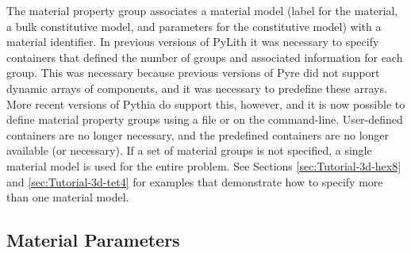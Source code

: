 The material property group associates a material model (label for the
material, a bulk constitutive model, and parameters for the
constitutive model) with a material identifier. In previous versions
of PyLith it was necessary to specify containers that defined the
number of groups and associated information for each group. This was
necessary because previous versions of Pyre did not support dynamic
arrays of components, and it was necessary to predefine these
arrays. More recent versions of Pythia do support this, however, and
it is now possible to define material property groups using a
 file or on the command-line. User-defined containers
are no longer necessary, and the predefined containers are no longer
available (or necessary). If a set of material groups is not
specified, a single material model is used for the entire problem. See
Sections \vref{sec:Tutorial-3d-hex8} and \vref{sec:Tutorial-3d-tet4}
for examples that demonstrate how to specify more than one material
model.


\subsection{Material Parameters}
\label{sec:material:parameters}

